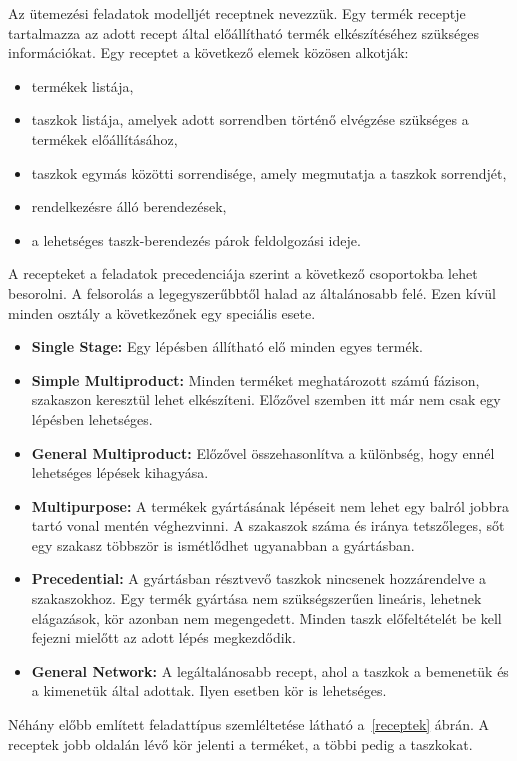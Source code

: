 Az ütemezési feladatok modelljét receptnek nevezzük. Egy termék receptje tartalmazza az adott recept által előállítható termék elkészítéséhez szükséges információkat\cite{Hegyhati}. Egy receptet a következő elemek közösen alkotják:
\begin{itemize}
  \item termékek listája,
  \item taszkok listája, amelyek adott sorrendben történő elvégzése szükséges a termékek előállításához,
  \item taszkok egymás közötti sorrendisége, amely megmutatja a taszkok sorrendjét,
  \item rendelkezésre álló berendezések,
  \item a lehetséges taszk-berendezés párok feldolgozási ideje.
\end{itemize}
A recepteket a feladatok precedenciája szerint a következő csoportokba lehet besorolni. A felsorolás a legegyszerűbbtől halad az általánosabb felé. Ezen kívül minden osztály a következőnek egy speciális esete.
\begin{itemize}
	\item \textbf{Single Stage:} Egy lépésben állítható elő minden egyes termék.
	\item \textbf{Simple Multiproduct:} Minden terméket meghatározott számú fázison, szakaszon keresztül lehet elkészíteni. Előzővel szemben itt már nem csak egy lépésben lehetséges.
	\item \textbf{General Multiproduct:} Előzővel összehasonlítva a különbség, hogy ennél lehetséges lépések kihagyása.
	\item \textbf{Multipurpose:} A termékek gyártásának lépéseit nem lehet egy balról jobbra tartó vonal mentén véghezvinni. A szakaszok száma és iránya tetszőleges, sőt egy szakasz többször is ismétlődhet ugyanabban a gyártásban.
	\item \textbf{Precedential:} A gyártásban résztvevő taszkok nincsenek hozzárendelve a szakaszokhoz. Egy termék gyártása nem szükségszerűen lineáris, lehetnek elágazások, kör azonban nem megengedett. Minden taszk előfeltételét be kell fejezni mielőtt az adott lépés megkezdődik. 
	\item \textbf{General Network:} A legáltalánosabb recept, ahol a taszkok a bemenetük és a kimenetük által adottak. Ilyen esetben kör is lehetséges.
\end{itemize}
Néhány előbb említett feladattípus szemléltetése látható a~\ref{receptek} ábrán. A receptek jobb oldalán lévő kör jelenti a terméket, a többi pedig a taszkokat.
